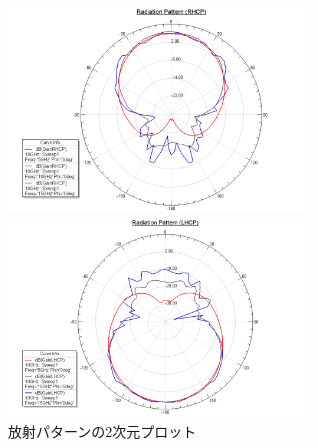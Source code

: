 \documentclass[11pt,a4paper,uplatex,draft]{ujarticle}
\begin{document}
  \begin{figure}[htbp]
    \centering
    \begin{minipage}[b]{0.42\hsize}
      \centering
      \includegraphics[keepaspectratio, width=80mm]{Images/radiation_pattern_rhcp.png}
    \end{minipage}
    \begin{minipage}[b]{0.42\hsize}
      \centering
      \includegraphics[keepaspectratio, width=80mm]{Images/radiation_pattern_lhcp.png}
    \end{minipage}
    \caption{放射パターンの2次元プロット}\label{fig:radiation_pattern_2D}
  \end{figure}
\end{document}
